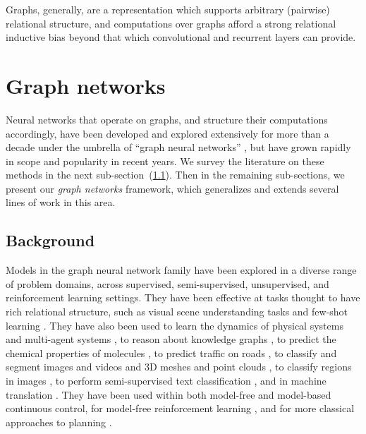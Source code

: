 Graphs, generally, are a representation which supports arbitrary (pairwise) relational structure, and computations over graphs afford a strong relational inductive bias beyond that which convolutional and recurrent layers can provide.

\section{Graph networks}
\label{sec:model}

Neural networks that operate on graphs, and structure their computations accordingly, have been developed and explored extensively for more than a decade under the umbrella of ``graph neural networks'' \citep{gori2005new,scarselli2005graph,scarselli2009computational,li2015gated}, but have grown rapidly in scope and popularity in recent years. We survey the literature on these methods in the next sub-section~(\ref{sec:gn-background}). Then in the remaining sub-sections, we present our \emph{graph networks} framework, which generalizes and extends several lines of work in this area.

\subsection{Background}
\label{sec:gn-background}

Models in the graph neural network family \citep{gori2005new,scarselli2005graph,scarselli2009computational,li2015gated} have been explored in a diverse range of problem domains, across supervised, semi-supervised, unsupervised, and reinforcement learning settings.
%
They have been effective at tasks thought to have rich relational structure, such as visual scene understanding tasks \citep{raposo2017discovering,santoro2017simple} and few-shot learning \citep{garcia2017few}.
They have also been used to learn the dynamics of physical systems \citep{battaglia2016interaction,chang2016compositional,watters2017visual,van2018relational,sanchez2018graph} and multi-agent systems \citep{sukhbaatar2016learning,hoshen2017vain,kipf2018neural}, to reason about knowledge graphs \citep{bordes2013translating,onoro2017representation,hamaguchi2017knowledge}, to predict the chemical properties of molecules \citep{duvenaud2015convolutional,gilmer2017neural}, to predict traffic on roads \citep{li2017diffusion,cui2018high}, to classify and segment images and videos \citep{wang2017non,hu2017relation} and 3D meshes and point clouds \citep{wang2018dynamic}, to classify regions in images \citep{chen2018iterative}, to perform semi-supervised text classification \citep{kipf2016semi}, and in machine translation \citep{vaswani2017attention,shaw2018self,gulcehre2018hyperbolic}.
They have been used within both model-free \citep{wang2018nervenet} and model-based \citep{hamrick2017metacontrol,pascanu2017learning,sanchez2018graph} continuous control, for model-free reinforcement learning \citep{hamrick2018relational,zambaldi2018relational}, and for more classical approaches to planning \citep{toyer2017action}.

